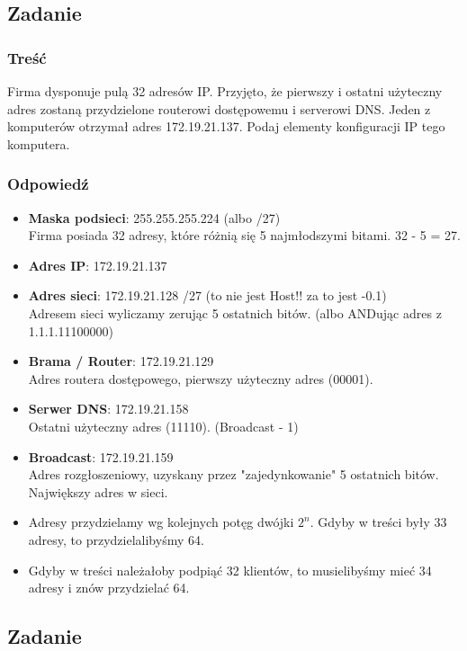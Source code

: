 \documentclass[a4paper,twoside]{article}
\begin{document}
\subsection{Zadanie}
\subsubsection{Treść}
Firma dysponuje pulą 32 adresów IP. Przyjęto, że pierwszy i ostatni użyteczny adres zostaną przydzielone routerowi dostępowemu i serverowi DNS. Jeden z komputerów otrzymał adres 172.19.21.137. Podaj elementy konfiguracji IP tego komputera.
\subsubsection{Odpowiedź}
\begin{itemize}
	\item \textbf{Maska podsieci}: 255.255.255.224 (albo /27)\\
	Firma posiada 32 adresy, które różnią się 5 najmłodszymi bitami. 32 - 5 = 27.
	\item \textbf{Adres IP}: 172.19.21.137
	\item \textbf{Adres sieci}: 172.19.21.128 /27 (to nie jest Host!! za to jest -0.1)\\
	Adresem sieci wyliczamy zerując 5 ostatnich bitów. (albo ANDując adres z 1.1.1.11100000)
	\item \textbf{Brama / Router}: 172.19.21.129\\
	Adres routera dostępowego, pierwszy użyteczny adres (00001).
	\item \textbf{Serwer DNS}: 172.19.21.158\\
	Ostatni użyteczny adres (11110). (Broadcast - 1)
	\item \textbf{Broadcast}: 172.19.21.159\\
	Adres rozgłoszeniowy, uzyskany przez "zajedynkowanie" 5 ostatnich bitów. Największy adres w sieci.
	\item Adresy przydzielamy wg kolejnych potęg dwójki $ 2^n $. Gdyby w treści były 33 adresy, to przydzielalibyśmy 64.
	\item Gdyby w treści należałoby podpiąć 32 klientów, to musielibyśmy mieć 34 adresy i znów przydzielać 64.
\end{itemize}
\subsection{Zadanie}
\end{document}
